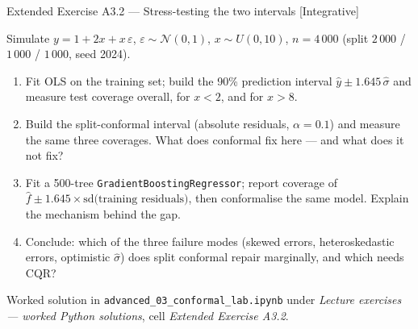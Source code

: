 \documentclass[aspectratio=169,11pt]{beamer}
\begin{document}
\begin{frame}{Extended Exercise A3.2 --- Stress-testing the two intervals [Integrative]}
\begin{longexercise}
  Simulate $y = 1 + 2x + x\,\varepsilon$, $\varepsilon \sim \mathcal{N}(0,1)$,
  $x \sim U(0, 10)$, $n = 4\,000$ (split $2\,000$ / $1\,000$ / $1\,000$, seed 2024).
  \begin{enumerate}
    \item Fit OLS on the training set; build the 90\% prediction interval
          $\hat y \pm 1.645\,\hat\sigma$ and measure test coverage overall, for
          $x < 2$, and for $x > 8$.
    \item Build the split-conformal interval (absolute residuals, $\alpha = 0.1$) and
          measure the same three coverages. What does conformal fix here --- and what
          does it not fix?
    \item Fit a 500-tree \texttt{GradientBoostingRegressor}; report coverage of
          $\hat f \pm 1.645 \times \text{sd(training residuals)}$, then conformalise
          the same model. Explain the mechanism behind the gap.
    \item Conclude: which of the three failure modes (skewed errors, heteroskedastic
          errors, optimistic $\hat\sigma$) does split conformal repair marginally,
          and which needs CQR?
  \end{enumerate}
\end{longexercise}
\begin{labnote}
  Worked solution in \texttt{advanced\_03\_conformal\_lab.ipynb} under \emph{Lecture
  exercises --- worked Python solutions}, cell \emph{Extended Exercise A3.2}.
\end{labnote}
\end{frame}
\end{document}
